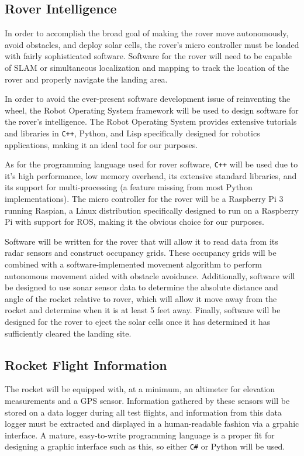 \documentclass[onecolumn, draftclsnofoot,10pt, compsoc]{IEEEtran}
\begin{document}
\subsection{Rover Intelligence}
In order to accomplish the broad goal of making the rover move autonomously, avoid obstacles, and deploy solar cells, the rover's micro controller must be loaded with fairly sophisticated software. Software for the rover will need to be capable of SLAM or simultaneous localization and mapping to track the location of the rover and properly navigate the landing area.
\par In order to avoid the ever-present software development issue of reinventing the wheel, the Robot Operating System framework will be used to design software for the rover's intelligence.
The Robot Operating System provides extensive tutorials and libraries in \verb!C++!, Python, and Lisp specifically designed for robotics applications, making it an ideal tool for our purposes.
\par As for the programming language used for rover software, \verb!C++! will be used due to it's high performance, low memory overhead, its extensive standard libraries, and its support for multi-processing (a feature missing from most Python implementations). 
The micro controller for the rover will be a Raspberry Pi 3 running Raspian, a Linux distribution specifically designed to run on a Raspberry Pi with support for ROS, making it the obvious choice for our purposes.
\par Software will be written for the rover that will allow it to read data from its radar sensors and construct occupancy grids. 
These occupancy grids will be combined with a software-implemented movement algorithm to perform autonomous movement aided with obstacle avoidance.
Additionally, software will be designed to use sonar sensor data to determine the absolute distance and angle of the rocket relative to rover, which will allow it move away from the rocket and determine when it is at least 5 feet away.
Finally, software will be designed for the rover to eject the solar cells once it has determined it has sufficiently cleared the landing site.
\subsection{Rocket Flight Information}
The rocket will be equipped with, at a minimum, an altimeter for elevation measurements and a GPS sensor. Information gathered by these sensors will be stored on a data logger during all test flights, and information from this data logger must be extracted and displayed in a human-readable fashion via a grpahic interface. A mature, easy-to-write programming language is a proper fit for designing a graphic interface such as this, so either \verb!C#! or Python will be used.
\end{document}

